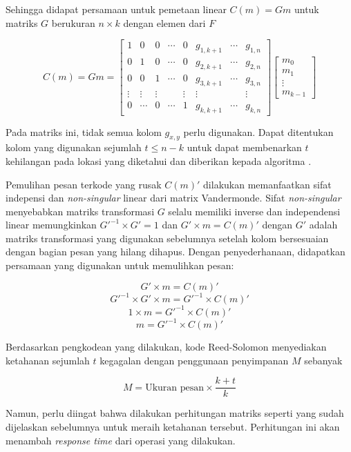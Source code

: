 Sehingga didapat persamaan untuk pemetaan linear $C(m) = Gm$ untuk matriks $G$ berukuran ${n} \times {k}$ dengan elemen dari $F$

\[
    C(m) = Gm = 
    \begin{bmatrix}
        1 & 0 & 0 & \cdots & 0 & g_{1,k+1} & \cdots & g_{1,n} \\
        0 & 1 & 0 & \cdots & 0 & g_{2,k+1} & \cdots & g_{2,n} \\
        0 & 0 & 1 & \cdots & 0 & g_{3,k+1} & \cdots & g_{3,n} \\
        \vdots & \vdots & \vdots & & \vdots & \vdots & & \vdots \\
        0 & \cdots & 0 & \cdots & 1 & g_{k,k+1} & \cdots & g_{k,n}
    \end{bmatrix}
    \begin{bmatrix}
        m_0 \\
        m_1 \\
        \vdots \\
        m_{k-1}
    \end{bmatrix}
\]

Pada matriks ini, tidak semua kolom $g_{x,y}$ perlu digunakan. Dapat ditentukan kolom yang digunakan sejumlah $t \le n - k$ untuk dapat membenarkan $t$ kehilangan pada lokasi yang diketahui dan diberikan kepada algoritma \parencite{riley2001introduction}.

Pemulihan pesan terkode yang rusak $C(m)'$ dilakukan memanfaatkan sifat indepensi dan \textit{non-singular} linear dari matrix Vandermonde. Sifat \textit{non-singular} menyebabkan matriks transformasi $G$ selalu memiliki inverse dan independensi linear memungkinkan $G'^{-1} \times G' = 1$ dan $G' \times m = C(m)'$ dengan $G'$ adalah matriks transformasi yang digunakan sebelumnya setelah kolom bersesuaian dengan bagian pesan yang hilang dihapus. Dengan penyederhanaan, didapatkan persamaan yang digunakan untuk memulihkan pesan:

\[G' \times m = C(m)'\]
\[G'^{-1} \times G' \times m = G'^{-1} \times C(m)'\]
\[1 \times m = G'^{-1} \times C(m)'\]
\[m = G'^{-1} \times C(m)'\]

Berdasarkan pengkodean yang dilakukan, kode Reed-Solomon menyediakan ketahanan sejumlah $t$ kegagalan dengan penggunaan penyimpanan $M$ sebanyak

\[M = \text{Ukuran pesan} \times \frac{k + t}{k}\]

Namun, perlu diingat bahwa dilakukan perhitungan matriks seperti yang sudah dijelaskan sebelumnya untuk meraih ketahanan tersebut. Perhitungan ini akan menambah \textit{response time} dari operasi yang dilakukan.
